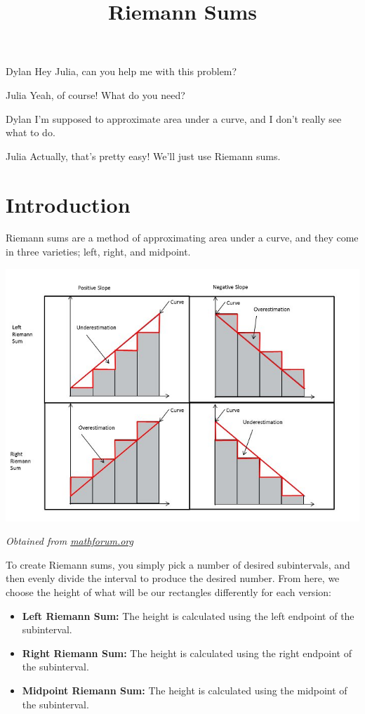 \documentclass{ximera}
\title{Riemann Sums}
\begin{document}
\maketitle
\begin{dialogue}
\item[Dylan] Hey Julia, can you help me with this problem?
\item[Julia] Yeah, of course! What do you need?
\item[Dylan] I'm supposed to approximate area under a curve, and I don't really see what to do.
\item[Julia] Actually, that's pretty easy! We'll just use Riemann sums.
\end{dialogue}

\section{Introduction}
Riemann sums are a method of approximating area under a curve, and they come in three varieties; left, right, and midpoint.

\begin{image}
\includegraphics{Table}
\end{image}
\begin{center}
\textit{Obtained from \href{http://mathforum.org/mathimages/index.php/Riemann_Sums}{mathforum.org}}
\end{center}


To create Riemann sums, you simply pick a number of desired subintervals, and then evenly divide the interval to produce the desired number. From here, we choose the height of what will be our rectangles differently for each version:
\begin{itemize}
\item{\textbf{Left Riemann Sum:} The height is calculated using the left endpoint of the subinterval.}
\item{\textbf{Right Riemann Sum:} The height is calculated using the right endpoint of the subinterval.}
\item{\textbf{Midpoint Riemann Sum:} The height is calculated using the midpoint of the subinterval.}
\end{itemize}
\end{document}
